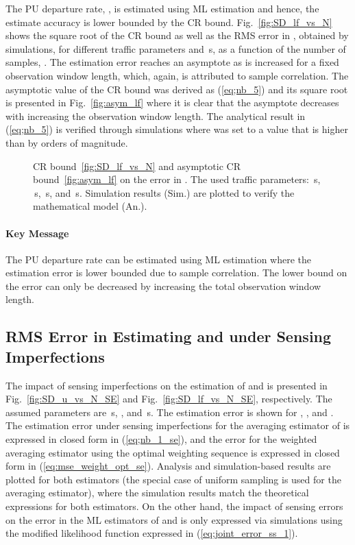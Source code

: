 \documentclass[11pt,draftclsnofoot,journal,onecolumn]{IEEEtran}
\begin{document}
The PU departure rate, , is estimated using ML estimation and hence, the estimate accuracy is lower bounded by the CR bound. Fig.~\ref{fig:SD_lf_vs_N} shows the square root of the CR bound as well as the RMS error in , obtained by simulations, for different traffic parameters and \,s, as a function of the number of samples, . The estimation error reaches an asymptote as  is increased for a fixed observation window length, which, again, is attributed to sample correlation. The asymptotic value of the CR bound was derived as (\ref{eq;nb_5}) and its square root is presented in Fig.~\ref{fig:asym_lf} where it is clear that the asymptote decreases with increasing the observation window length. The analytical result in (\ref{eq;nb_5}) is verified through simulations where  was set to a value that is higher than  by orders of magnitude.
\begin{figure}
\centering
{}
\caption{CR bound~\ref{fig:SD_lf_vs_N} and asymptotic CR bound~\ref{fig:asym_lf} on the error in . The used traffic parameters: \,s, \,s, \,s, and \,s. Simulation results (Sim.) are plotted to verify the mathematical model (An.).}
\end{figure}

\paragraph*{Key Message}

The PU departure rate can be estimated using ML estimation where the estimation error is lower bounded due to sample correlation. The lower bound on the error can only be decreased by increasing the total observation window length.

\subsection{RMS Error in Estimating  and  under Sensing Imperfections}
\label{sec:num_MSE_u_lf_se}

The impact of sensing imperfections on the estimation of  and  is presented in Fig.~\ref{fig:SD_u_vs_N_SE} and Fig.~\ref{fig:SD_lf_vs_N_SE}, respectively. The assumed parameters are \,s, , and \,s. The estimation error is shown for , , and . The estimation error under sensing imperfections for the averaging estimator of  is expressed in closed form in (\ref{eq;nb_1_se}), and the error for the weighted averaging estimator using the optimal weighting sequence is expressed in closed form in (\ref{eq:mse_weight_opt_se}). Analysis and simulation-based results are plotted for both estimators (the special case of uniform sampling is used for the averaging estimator), where the simulation results match the theoretical expressions for both estimators. On the other hand, the impact of sensing errors on the error in the ML estimators of  and  is only expressed via simulations using the modified likelihood function expressed in (\ref{eq;joint_error_ss_1}).
\end{document}
